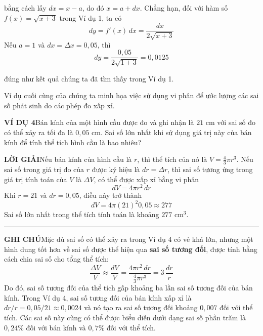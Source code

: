 \noindent
\hfill
\begin{minipage}[t]{128mm}
    \noindent bằng cách lấy $dx = x - a$, do đó $x = a + dx$. Chẳng hạn, đối với hàm số $f(x) = \sqrt{x+3}$ trong Ví dụ 1, ta có
    \[
    dy = f'(x)\,dx = \frac{dx}{2\sqrt{x+3}}
    \]
    Nếu $a = 1$ và $dx = \Delta x = 0{,}05$, thì
    \[
    dy = \frac{0{,}05}{2\sqrt{1+3}} = 0{,}0125
    \]
    \noindent{}%
    \vspace{1mm}

    \noindent đúng như kết quả chúng ta đã tìm thấy trong Ví dụ 1.

    \medskip
    \indent Ví dụ cuối cùng của chúng ta minh họa việc sử dụng vi phân để ước lượng các sai số phát sinh do các phép đo xấp xỉ.

    \medskip
    \noindent\textbf{\textsf{\color{stewartcyan}VÍ DỤ 4}}\quad Bán kính của một hình cầu được đo và ghi nhận là $21\text{ cm}$ với sai số đo có thể xảy ra tối đa là $0{,}05\text{ cm}$. Sai số lớn nhất khi sử dụng giá trị này của bán kính để tính thể tích hình cầu là bao nhiêu?

    \medskip
    \noindent\textbf{\textsf{\color{stewartcyan}LỜI GIẢI}}\quad Nếu bán kính của hình cầu là $r$, thì thể tích của nó là $V = \frac{4}{3}\pi r^3$. Nếu sai số trong giá trị đo của $r$ được ký hiệu là $dr = \Delta r$, thì sai số tương ứng trong giá trị tính toán của $V$ là $\Delta V$, có thể được xấp xỉ bằng vi phân
    \[
    dV = 4\pi r^2\,dr
    \]
    Khi $r = 21$ và $dr = 0{,}05$, điều này trở thành
    \[
    dV = 4\pi (21)^2 0{,}05 \approx 277
    \]
    Sai số lớn nhất trong thể tích tính toán là khoảng $277\text{ cm}^3$.\hfill{\color{stewartcyan}\rule{1.15ex}{1.15ex}}

    \medskip
    \noindent\textbf{\textsf{\color{stewartgreen}GHI CHÚ}}\quad Mặc dù sai số có thể xảy ra trong Ví dụ 4 có vẻ khá lớn, nhưng một hình dung tốt hơn về sai số được thể hiện qua \textbf{sai số tương đối}, được tính bằng cách chia sai số cho tổng thể tích:
    \[
    \frac{\Delta V}{V} \approx \frac{dV}{V} = \frac{4\pi r^2\,dr}{\frac{4}{3}\pi r^3} = 3\,\frac{dr}{r}
    \]
    Do đó, sai số tương đối của thể tích gấp khoảng ba lần sai số tương đối của bán kính. Trong Ví dụ 4, sai số tương đối của bán kính xấp xỉ là $dr/r = 0{,}05/21 \approx 0{,}0024$ và nó tạo ra sai số tương đối khoảng $0{,}007$ đối với thể tích. Các sai số này cũng có thể được biểu diễn dưới dạng sai số phần trăm là $0{,}24\%$ đối với bán kính và $0{,}7\%$ đối với thể tích.
\end{minipage}


